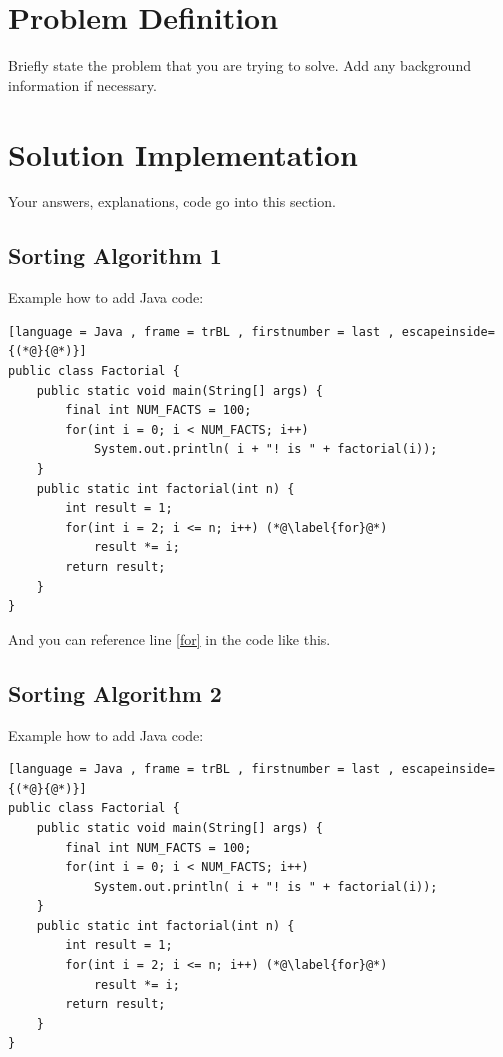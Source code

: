 \documentclass[11pt]{article}
\begin{document}
\section{Problem Definition}

Briefly state the problem that you are trying to solve. Add any background information if necessary.


\section{Solution Implementation}

Your answers, explanations, code go into this section.

\subsection{Sorting Algorithm 1}

Example how to add Java code:

\begin{lstlisting}[language = Java , frame = trBL , firstnumber = last , escapeinside={(*@}{@*)}]
public class Factorial {
    public static void main(String[] args) {
        final int NUM_FACTS = 100;
        for(int i = 0; i < NUM_FACTS; i++)
            System.out.println( i + "! is " + factorial(i));
    }
    public static int factorial(int n) {   
        int result = 1;
        for(int i = 2; i <= n; i++) (*@\label{for}@*)
            result *= i;
        return result;
    }
}
\end{lstlisting}

And you can reference line \ref{for} in the code like this.

\subsection{Sorting Algorithm 2}

Example how to add Java code:

\begin{lstlisting}[language = Java , frame = trBL , firstnumber = last , escapeinside={(*@}{@*)}]
public class Factorial {
    public static void main(String[] args) {
        final int NUM_FACTS = 100;
        for(int i = 0; i < NUM_FACTS; i++)
            System.out.println( i + "! is " + factorial(i));
    }
    public static int factorial(int n) {   
        int result = 1;
        for(int i = 2; i <= n; i++) (*@\label{for}@*)
            result *= i;
        return result;
    }
}
\end{lstlisting}
\end{document}
